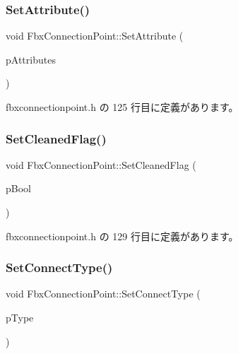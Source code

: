 \subsubsection{\texorpdfstring{Set\+Attribute()}{SetAttribute()}}
{\footnotesize\ttfamily void Fbx\+Connection\+Point\+::\+Set\+Attribute (\begin{DoxyParamCaption}\item[{int}]{p\+Attributes }\end{DoxyParamCaption})\hspace{0.3cm}{\ttfamily [inline]}}



 fbxconnectionpoint.\+h の 125 行目に定義があります。

\mbox{\label{class_fbx_connection_point_a0d2010007894dd64e5399b4f473740a7}} 
\subsubsection{\texorpdfstring{Set\+Cleaned\+Flag()}{SetCleanedFlag()}}
{\footnotesize\ttfamily void Fbx\+Connection\+Point\+::\+Set\+Cleaned\+Flag (\begin{DoxyParamCaption}\item[{bool}]{p\+Bool }\end{DoxyParamCaption})\hspace{0.3cm}{\ttfamily [inline]}}



 fbxconnectionpoint.\+h の 129 行目に定義があります。

\mbox{\label{class_fbx_connection_point_a9cfa16bd93ff0f631ccd8d6de77b05c3}} 
\subsubsection{\texorpdfstring{Set\+Connect\+Type()}{SetConnectType()}}
{\footnotesize\ttfamily void Fbx\+Connection\+Point\+::\+Set\+Connect\+Type (\begin{DoxyParamCaption}\item[{\hyperlink{class_fbx_connection_point_a152767d2d289717698ab68d808f979b5}{E\+Type}}]{p\+Type }\end{DoxyParamCaption})\hspace{0.3cm}{\ttfamily [inline]}}



